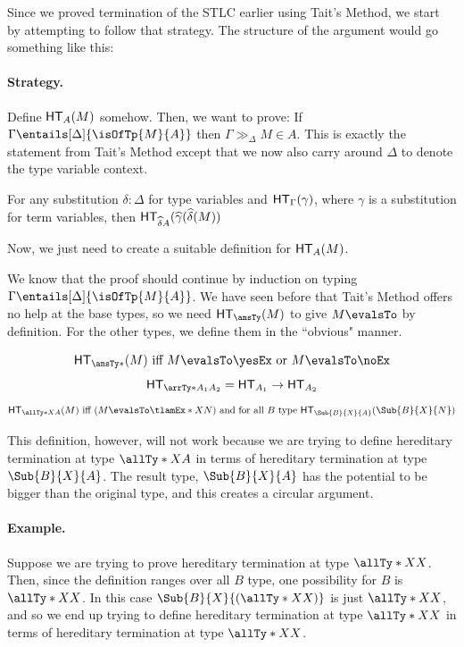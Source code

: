 \documentclass[letterpaper]{article}
\begin{document}
Since we proved termination of the STLC earlier using Tait's Method, we start by attempting to follow that strategy. The structure of the argument would go something like this:
\paragraph{Strategy.} Define $\HT[A](M)$ somehow. Then, we want to prove: If $\Gamma \entails[\Delta]{\isOfTp{M}{A}}$ then $\Gamma \gg_{\Delta} M \in A$. This is exactly the statement from Tait's Method except that we now also carry around $\Delta$ to denote the type variable context.

\begin{definition}
For any substitution $\delta : \Delta$ for type variables and $\HT[\Gamma](\gamma)$, where $\gamma$ is a substitution for term variables, then $\HT[\widehat{\delta}A](\widehat{\gamma}(\widehat{\delta}(M))$
\end{definition}

Now, we just need to create a suitable definition for $\HT[A](M)$.

We know that the proof should continue by induction on typing $\Gamma \entails[\Delta]{\isOfTp{M}{A}}$. We have seen before that Tait's Method offers no help at the base types, so we need $\HT[\ansTy](M)$ to give $M \evalsTo$ by definition. For the other types, we define them in the ``obvious" manner.

$$
\HT[\ansTy*](M) \text{ iff } M \evalsTo \yesEx \text{ or } M \evalsTo \noEx
$$
$$
\HT[\arrTy*{A_1}{A_2}] = \HT[A_1] \rightarrow \HT[A_2]
$$
$$
\HT[\allTy*{X}{A}](M) \text{ iff } (M \evalsTo \tlamEx*{X}{N}) \text{ and for all } B \text{ type } \HT[\Sub{B}{X}{A}](\Sub{B}{X}{N})
$$

This definition, however, will not work because we are trying to define hereditary termination at type $\allTy*{X}{A}$ in terms of hereditary termination at type $\Sub{B}{X}{A}$. The result type, $\Sub{B}{X}{A}$ has the potential to be bigger than the original type, and this creates a circular argument.

\paragraph{Example.} Suppose we are trying to prove hereditary termination at type $\allTy*{X}{X}$. Then, since the definition ranges over all $B$ type, one possibility for $B$ is $\allTy*{X}{X}$. In this case $\Sub{B}{X}{(\allTy*{X}{X})}$ is just $\allTy*{X}{X}$, and so we end up trying to define hereditary termination at type $\allTy*{X}{X}$ in terms of hereditary termination at type $\allTy*{X}{X}$.
\end{document}
